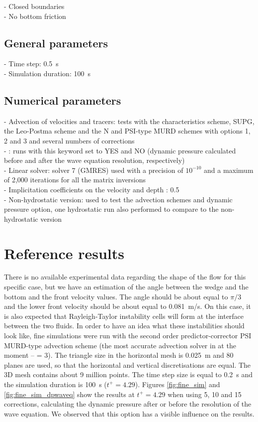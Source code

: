 - Closed boundaries\\
- No bottom friction

\subsection{General parameters}

- Time step: 0.5~s\\
- Simulation duration: 100~s

\subsection{Numerical parameters}

- Advection of velocities and tracers: tests with the characteristics scheme, SUPG,
the Leo-Postma scheme and the N and PSI-type MURD schemes with options 1, 2 and 3
and several numbers of corrections\\
- : runs with this keyword set to YES and NO
(dynamic pressure calculated before and after the wave equation resolution, respectively)\\
- Linear solver: solver 7 (GMRES) used with a precision of $10^{-10}$ and a
maximum of 2,000 iterations for all the matrix inversions\\
- Implicitation coefficients on the velocity and depth : 0.5\\
- Non-hydrostatic version: used to test the advection schemes and dynamic
pressure option, one hydrostatic run also performed to
compare to the non-hydrostatic version

\section{Reference results}

There is no available experimental data regarding the shape of the flow for
this specific case, but we have an estimation of the angle between the wedge and
the bottom and the
front velocity values. The angle should be about equal to $\pi/3$ and the lower front
velocity should be about equal to 0.081~m/s.
On this case, it is also expected that Rayleigh-Taylor instability cells will
form at the interface between the two fluids.
In order to have an idea what these instabilities should look like, fine
simulations were run
with the second order predictor-corrector PSI MURD-type advection scheme
(the most accurate advection solver in  at the moment --
 = 3).
The triangle size in the horizontal mesh is 0.025~m and 80 planes are used,
so that the horizontal and vertical discretisations are equal.
The 3D mesh contains about 9 million points. The time step size is equal to 0.2~s
and the simulation duration is 100~s ($t^+=4.29$).
Figures \ref{fig:fine_sim} and \ref{fig:fine_sim_dpwaveq} show the
results at $t^+=4.29$ when using 5, 10 and 15 corrections,
calculating the dynamic pressure after or before the resolution of the wave equation.
We observed that this option has a visible influence on the results.

